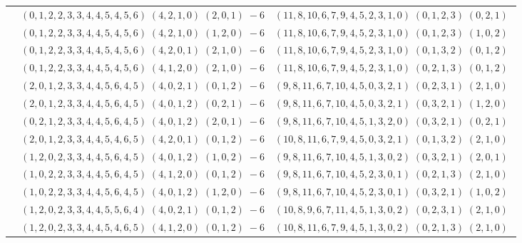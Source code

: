 \documentclass[11pt]{article}
\begin{document}
\begin{longtable}[l]{|c|c|c|}
 \cline{2-3} 
 & $(0 ,1 ,2 ,2 ,3 ,3 ,4 ,4 ,5 ,4 ,5 ,6) \;(4 ,2 ,1 ,0) \;(2 ,0 ,1) \;-6$ & $(11 ,8 ,10 ,6 ,7 ,9 ,4 ,5 ,2 ,3 ,1 ,0) \;(0 ,1 ,2 ,3) \;(0 ,2 ,1) \;$\\ 
 \cline{2-3} 
 & $(0 ,1 ,2 ,2 ,3 ,3 ,4 ,4 ,5 ,4 ,5 ,6) \;(4 ,2 ,1 ,0) \;(1 ,2 ,0) \;-6$ & $(11 ,8 ,10 ,6 ,7 ,9 ,4 ,5 ,2 ,3 ,1 ,0) \;(0 ,1 ,2 ,3) \;(1 ,0 ,2) \;$\\ 
 \cline{2-3} 
 & $(0 ,1 ,2 ,2 ,3 ,3 ,4 ,4 ,5 ,4 ,5 ,6) \;(4 ,2 ,0 ,1) \;(2 ,1 ,0) \;-6$ & $(11 ,8 ,10 ,6 ,7 ,9 ,4 ,5 ,2 ,3 ,1 ,0) \;(0 ,1 ,3 ,2) \;(0 ,1 ,2) \;$\\ 
 \cline{2-3} 
 & $(0 ,1 ,2 ,2 ,3 ,3 ,4 ,4 ,5 ,4 ,5 ,6) \;(4 ,1 ,2 ,0) \;(2 ,1 ,0) \;-6$ & $(11 ,8 ,10 ,6 ,7 ,9 ,4 ,5 ,2 ,3 ,1 ,0) \;(0 ,2 ,1 ,3) \;(0 ,1 ,2) \;$\\ 
 \cline{2-3} 
 & $(2 ,0 ,1 ,2 ,3 ,3 ,4 ,4 ,5 ,6 ,4 ,5) \;(4 ,0 ,2 ,1) \;(0 ,1 ,2) \;-6$ & $(9 ,8 ,11 ,6 ,7 ,10 ,4 ,5 ,0 ,3 ,2 ,1) \;(0 ,2 ,3 ,1) \;(2 ,1 ,0) \;$\\ 
 \cline{2-3} 
 & $(2 ,0 ,1 ,2 ,3 ,3 ,4 ,4 ,5 ,6 ,4 ,5) \;(4 ,0 ,1 ,2) \;(0 ,2 ,1) \;-6$ & $(9 ,8 ,11 ,6 ,7 ,10 ,4 ,5 ,0 ,3 ,2 ,1) \;(0 ,3 ,2 ,1) \;(1 ,2 ,0) \;$\\ 
 \cline{2-3} 
 & $(0 ,2 ,1 ,2 ,3 ,3 ,4 ,4 ,5 ,6 ,4 ,5) \;(4 ,0 ,1 ,2) \;(2 ,0 ,1) \;-6$ & $(9 ,8 ,11 ,6 ,7 ,10 ,4 ,5 ,1 ,3 ,2 ,0) \;(0 ,3 ,2 ,1) \;(0 ,2 ,1) \;$\\ 
 \cline{2-3} 
 & $(2 ,0 ,1 ,2 ,3 ,3 ,4 ,4 ,5 ,4 ,6 ,5) \;(4 ,2 ,0 ,1) \;(0 ,1 ,2) \;-6$ & $(10 ,8 ,11 ,6 ,7 ,9 ,4 ,5 ,0 ,3 ,2 ,1) \;(0 ,1 ,3 ,2) \;(2 ,1 ,0) \;$\\ 
 \cline{2-3} 
 & $(1 ,2 ,0 ,2 ,3 ,3 ,4 ,4 ,5 ,6 ,4 ,5) \;(4 ,0 ,1 ,2) \;(1 ,0 ,2) \;-6$ & $(9 ,8 ,11 ,6 ,7 ,10 ,4 ,5 ,1 ,3 ,0 ,2) \;(0 ,3 ,2 ,1) \;(2 ,0 ,1) \;$\\ 
 \cline{2-3} 
 & $(1 ,0 ,2 ,2 ,3 ,3 ,4 ,4 ,5 ,6 ,4 ,5) \;(4 ,1 ,2 ,0) \;(0 ,1 ,2) \;-6$ & $(9 ,8 ,11 ,6 ,7 ,10 ,4 ,5 ,2 ,3 ,0 ,1) \;(0 ,2 ,1 ,3) \;(2 ,1 ,0) \;$\\ 
 \cline{2-3} 
 & $(1 ,0 ,2 ,2 ,3 ,3 ,4 ,4 ,5 ,6 ,4 ,5) \;(4 ,0 ,1 ,2) \;(1 ,2 ,0) \;-6$ & $(9 ,8 ,11 ,6 ,7 ,10 ,4 ,5 ,2 ,3 ,0 ,1) \;(0 ,3 ,2 ,1) \;(1 ,0 ,2) \;$\\ 
 \cline{2-3} 
 & $(1 ,2 ,0 ,2 ,3 ,3 ,4 ,4 ,5 ,5 ,6 ,4) \;(4 ,0 ,2 ,1) \;(0 ,1 ,2) \;-6$ & $(10 ,8 ,9 ,6 ,7 ,11 ,4 ,5 ,1 ,3 ,0 ,2) \;(0 ,2 ,3 ,1) \;(2 ,1 ,0) \;$\\ 
 \cline{2-3} 
 & $(1 ,2 ,0 ,2 ,3 ,3 ,4 ,4 ,5 ,4 ,6 ,5) \;(4 ,1 ,2 ,0) \;(0 ,1 ,2) \;-6$ & $(10 ,8 ,11 ,6 ,7 ,9 ,4 ,5 ,1 ,3 ,0 ,2) \;(0 ,2 ,1 ,3) \;(2 ,1 ,0) \;$\\ 

\end{longtable}
\end{document}
